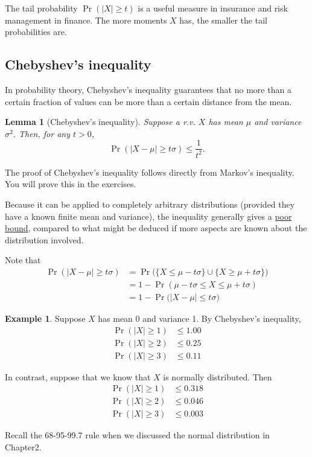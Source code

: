 \documentclass[
]{book}
\newtheorem{lemma}{Lemma}[chapter]
\theoremstyle{definition}
\theoremstyle{definition}
\newtheorem{example}{Example}[chapter]
\theoremstyle{definition}
\theoremstyle{definition}
\theoremstyle{remark}
\begin{document}
The tail probability \(\Pr(|X|\geq t)\) is a useful measure in insurance and
risk management in finance. The more moments \(X\) has, the smaller the
tail probabilities are.

\hypertarget{chebyshevs-inequality}{%
\subsection{Chebyshev's inequality}\label{chebyshevs-inequality}}

In probability theory, Chebyshev's inequality guarantees that no more
than a certain fraction of values can be more than a certain distance
from the mean.

\begin{lemma}[Chebyshev's inequality]
Suppose a r.v. \(X\) has mean \(\mu\) and variance \(\sigma^2\). Then, for any
\(t>0\), \[\Pr(|X-\mu| \geq t\sigma) \leq \frac{1}{t^2}.\]
\end{lemma}

The proof of Chebyshev's inequality follows directly from Markov's inequality. You will prove this in the exercises.

Because it can be applied to completely arbitrary distributions (provided they have a known finite mean and variance), the inequality generally gives a \uline{poor bound}, compared to what might be deduced if more aspects are known about the distribution involved.

Note that
\begin{align*}
\Pr(|X-\mu| \geq t\sigma)
&= \Pr\big(\{ X \leq \mu - t\sigma \} \cup \{ X \geq \mu + t\sigma \}\big) \\
&= 1 - \Pr( \mu - t\sigma \leq X \leq \mu + t\sigma ) \\
&= 1 - \Pr\big(|X-\mu| \leq t\sigma\big)
\end{align*}

\begin{example}
Suppose \(X\) has mean 0 and variance 1. By Chebyshev's inequality,
\[\begin{aligned}
    \Pr(|X| \geq 1) &\leq 1.00 \\
    \Pr(|X| \geq 2) &\leq 0.25 \\
    \Pr(|X| \geq 3) &\leq 0.11 
  \end{aligned}\]

In contrast, suppose that we know that \(X\) is normally
distributed. Then \[\begin{aligned}
    \Pr(|X| \geq 1) &\leq 0.318 \\
    \Pr(|X| \geq 2) &\leq 0.046 \\
    \Pr(|X| \geq 3) &\leq 0.003 
  \end{aligned}\]

Recall the 68-95-99.7 rule when we discussed the normal distribution in Chapter2.
\end{example}
\end{document}
